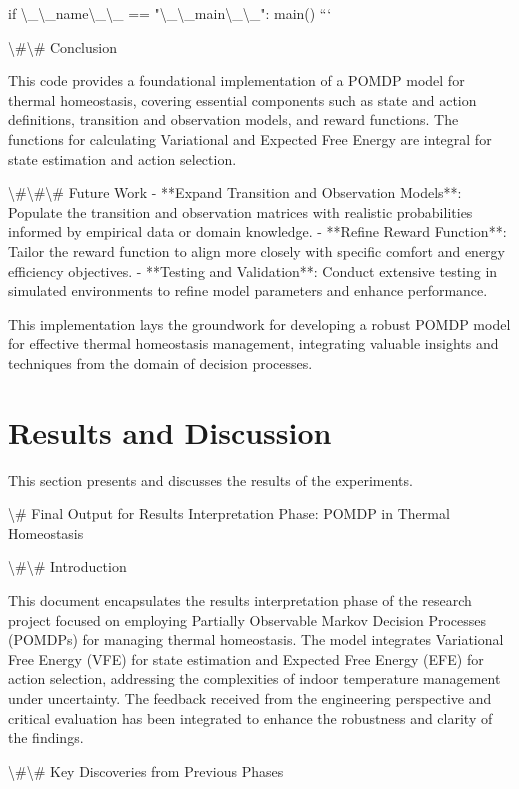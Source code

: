 \documentclass[11pt,a4paper]{article}
\begin{document}
if \textbackslash{}_\textbackslash{}_name\textbackslash{}_\textbackslash{}_ == "\textbackslash{}_\textbackslash{}_main\textbackslash{}_\textbackslash{}_":
    main()
```

\textbackslash{}#\textbackslash{}# Conclusion

This code provides a foundational implementation of a POMDP model for thermal homeostasis, covering essential components such as state and action definitions, transition and observation models, and reward functions. The functions for calculating Variational and Expected Free Energy are integral for state estimation and action selection.

\textbackslash{}#\textbackslash{}#\textbackslash{}# Future Work
- **Expand Transition and Observation Models**: Populate the transition and observation matrices with realistic probabilities informed by empirical data or domain knowledge.
- **Refine Reward Function**: Tailor the reward function to align more closely with specific comfort and energy efficiency objectives.
- **Testing and Validation**: Conduct extensive testing in simulated environments to refine model parameters and enhance performance.

This implementation lays the groundwork for developing a robust POMDP model for effective thermal homeostasis management, integrating valuable insights and techniques from the domain of decision processes.
\section{Results and Discussion}

This section presents and discusses the results of the experiments.

\textbackslash{}# Final Output for Results Interpretation Phase: POMDP in Thermal Homeostasis

\textbackslash{}#\textbackslash{}# Introduction

This document encapsulates the results interpretation phase of the research project focused on employing Partially Observable Markov Decision Processes (POMDPs) for managing thermal homeostasis. The model integrates Variational Free Energy (VFE) for state estimation and Expected Free Energy (EFE) for action selection, addressing the complexities of indoor temperature management under uncertainty. The feedback received from the engineering perspective and critical evaluation has been integrated to enhance the robustness and clarity of the findings.

\textbackslash{}#\textbackslash{}# Key Discoveries from Previous Phases
\end{document}
